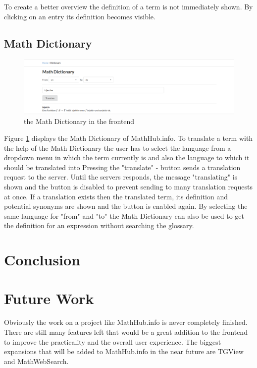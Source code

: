 \documentclass[11pt,a4paper]{article}
\begin{document}
To create a better overview the definition of a term is not immediately shown.
By clicking on an entry its definition becomes visible.

\subsection{Math Dictionary}
\begin{figure}[H]
\includegraphics[width=1\textwidth]{dictionary.png}
\caption{the Math Dictionary in the frontend}
\label{fig:dict}
\end{figure}
Figure \ref{fig:dict} displays the Math Dictionary of MathHub.info.
To translate a term with the help of the Math Dictionary the user has to select the language from a dropdown menu in which the term currently is and also the language to which it should be translated into
Pressing the "translate" - button sends a translation request to the server.
Until the servers responds, the message "translating" is shown and the button is disabled to prevent sending to many translation requests at once.
If a translation exists then the translated term, its definition and potential synonyms are shown and the button is enabled again.
By selecting the same language for "from" and "to" the Math Dictionary can also be used to get the definition for an expression without searching the glossary.

\section{Conclusion} \label{conclusion}
\section{Future Work} \label{future}
Obviously the work on a project like MathHub.info is never completely finished.
There are still many features left that would be a great addition to the frontend to improve the practicality and the overall user experience. 
The biggest expansions that will be added to MathHub.info in the near future are TGView and MathWebSearch.
\end{document}
